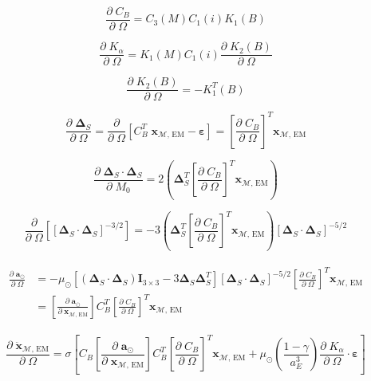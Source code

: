 \documentclass[]{article}
\newcommand{\pd}[2]{\frac{\partial\;#1}{\partial\;#2}}
\newcommand{\pddown}[2]{\frac{\partial}{\partial\;#2} \left[ #1 \right] }
\begin{document}
	\begin{equation*}
		\pd{C_B}{\Omega} = C_3(M) C_1(i) K_1(B)
	\end{equation*}
	
	\begin{equation*}
		\pd{K_\alpha}{\Omega} = K_1(M) C_1(i) \pd{K_2(B)}{\Omega}
	\end{equation*}
	
	\begin{equation*}
		\pd{K_2(B)}{\Omega} = -K_1^T(B)
	\end{equation*}
	
	\begin{equation*}
		\pd{\boldsymbol{\Delta}_S}{\Omega} = \pddown{C_B^T \; \mathbf{x}_{\mathcal{M}\text{, EM}} - \boldsymbol{\varepsilon}}{\Omega} = \left[ \pd{C_B}{\Omega} \right]^T \mathbf{x}_{\mathcal{M}\text{, EM}}
	\end{equation*}
	
	\begin{equation*}
		\pd{\boldsymbol{\Delta}_S \cdot \boldsymbol{\Delta}_S}{M_0} = 2\left( \boldsymbol{\Delta}_S^T \left[ \pd{C_B}{\Omega} \right]^T \mathbf{x}_{\mathcal{M}\text{, EM}} \right)
	\end{equation*}
	
	\begin{equation*}
		\pddown{ [\boldsymbol{\Delta}_S \cdot \boldsymbol{\Delta}_S]^{-3/2} }{\Omega} = -3 \left( \boldsymbol{\Delta}_S^T \left[ \pd{C_B}{\Omega} \right]^T \mathbf{x}_{\mathcal{M}\text{, EM}} \right) [\boldsymbol{\Delta}_S \cdot \boldsymbol{\Delta}_S]^{-5/2}
	\end{equation*}
	
	\begin{align}
	\begin{split}
		\pd{\mathbf{a}_{\odot}}{\Omega}
		&= -\mu_\odot \left[ (\boldsymbol{\Delta}_S \cdot \boldsymbol{\Delta}_S)\mathbf{I}_{3\times 3} - 3 \boldsymbol{\Delta}_S \boldsymbol{\Delta}_S^T \right] [\boldsymbol{\Delta}_S \cdot \boldsymbol{\Delta}_S]^{-5/2} \left[ \pd{C_B}{\Omega} \right]^T \mathbf{x}_{\mathcal{M}\text{, EM}} \\
		&= \left[\pd{\mathbf{a}_{\odot}}{ \mathbf{x}_{\mathcal{M}\text{, EM}} }\right] C_B^T \left[ \pd{C_B}{\Omega} \right]^T \mathbf{x}_{\mathcal{M}\text{, EM}}
	\end{split}
	\end{align}
	
	\begin{equation}
		\pd{\ddot{\mathbf{x}}_{\mathcal{M}\text{, EM}}}{\Omega} = \sigma \left[ C_B \left[\pd{\mathbf{a}_{\odot}}{ \mathbf{x}_{\mathcal{M}\text{, EM}} }\right] C_B^T \left[ \pd{C_B}{\Omega} \right]^T \mathbf{x}_{\mathcal{M}\text{, EM}} + \mu_\odot \left(\frac{1-\gamma}{a_E^3}\right) \pd{K_\alpha}{\Omega} \cdot \boldsymbol{\varepsilon} \right]
	\end{equation}
	
\end{document}
